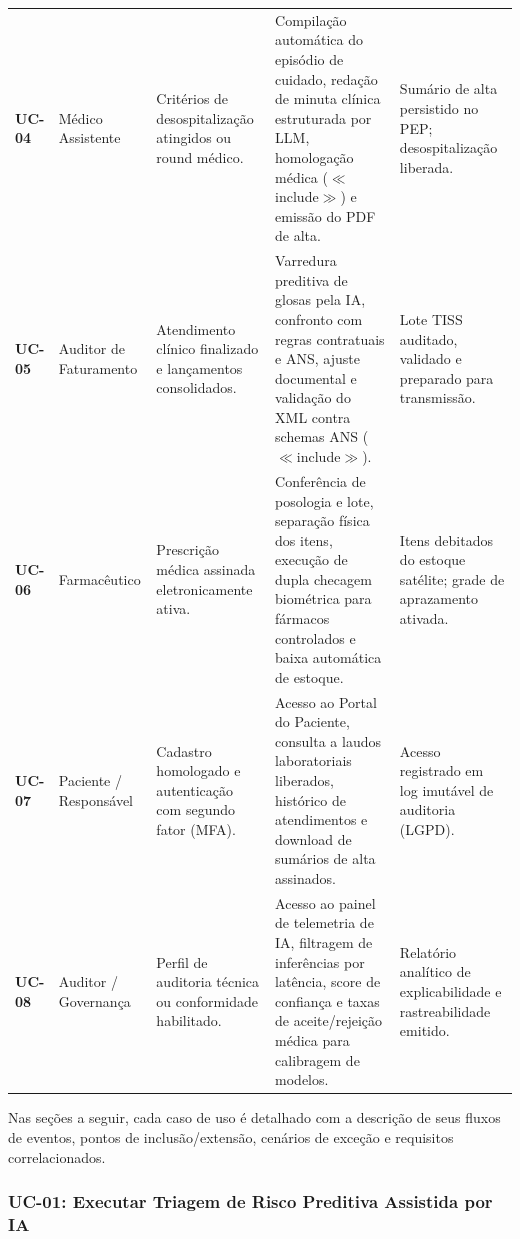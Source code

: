 \begin{xltabular}{\textwidth}{l >{\raggedright\arraybackslash}p{2.8cm} >{\raggedright\arraybackslash}p{3.5cm} >{\raggedright\arraybackslash}X >{\raggedright\arraybackslash}p{2.8cm}}
\textbf{UC-04} & 
Médico Assistente & 
Critérios de desospitalização atingidos ou round médico. & 
Compilação automática do episódio de cuidado, redação de minuta clínica estruturada por LLM, homologação médica ($\ll$include$\gg$) e emissão do PDF de alta. & 
Sumário de alta persistido no PEP; desospitalização liberada. \\
\addlinespace

\textbf{UC-05} & 
Auditor de Faturamento & 
Atendimento clínico finalizado e lançamentos consolidados. & 
Varredura preditiva de glosas pela IA, confronto com regras contratuais e ANS, ajuste documental e validação do XML contra schemas ANS ($\ll$include$\gg$). & 
Lote TISS auditado, validado e preparado para transmissão. \\
\addlinespace

\textbf{UC-06} & 
Farmacêutico & 
Prescrição médica assinada eletronicamente ativa. & 
Conferência de posologia e lote, separação física dos itens, execução de dupla checagem biométrica para fármacos controlados e baixa automática de estoque. & 
Itens debitados do estoque satélite; grade de aprazamento ativada. \\
\addlinespace

\textbf{UC-07} & 
Paciente / Responsável & 
Cadastro homologado e autenticação com segundo fator (MFA). & 
Acesso ao Portal do Paciente, consulta a laudos laboratoriais liberados, histórico de atendimentos e download de sumários de alta assinados. & 
Acesso registrado em log imutável de auditoria (LGPD). \\
\addlinespace

\textbf{UC-08} & 
Auditor / Governança & 
Perfil de auditoria técnica ou conformidade habilitado. & 
Acesso ao painel de telemetria de IA, filtragem de inferências por latência, score de confiança e taxas de aceite/rejeição médica para calibragem de modelos. & 
Relatório analítico de explicabilidade e rastreabilidade emitido. \\

\end{xltabular}
\endgroup

Nas seções a seguir, cada caso de uso é detalhado com a descrição de seus fluxos de eventos, pontos de inclusão/extensão, cenários de exceção e requisitos correlacionados.

\subsubsection{UC-01: Executar Triagem de Risco Preditiva Assistida por IA}
\label{sec:uc01}

